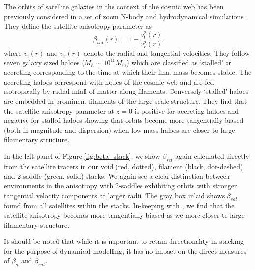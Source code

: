 The orbits of satellite galaxies in the context of the cosmic web has been previously considered in a set of zoom N-body and hydrodynamical simulations \citep{ZOMGiii}. They define the satellite anisotropy parameter as
\begin{equation}
\beta_{sat}(r) = 1 - \frac{v_{t}^2(r)}{v_{r}^{2}(r)} 
\end{equation}
where $v_{t}(r)$ and $v_{r}(r)$ denote the radial and tangential velocities. They follow seven galaxy sized haloes ($M_{h} \sim 10^{11} M_{\odot}$) which are classified as `stalled' or accreting corresponding to the time at which their final mass becomes stable. The accreting haloes correspond with  nodes of the cosmic web and are fed isotropically by radial infall of matter along filaments. Conversely `stalled' haloes are embedded in prominent filaments of the large-scale structure. They find that the satellite anisotropy parameter at $z = 0$ is positive for accreting haloes and negative for stalled haloes showing that orbits become more tangentially biased (both in magnitude and dispersion) when low mass haloes are closer to large filamentary structure. 

In the left panel of Figure \ref{fig:beta_stack}, we show $\beta_{sat}$ again calculated directly from the satellite tracers in our void (red, dotted), filament (black, dot-dashed) and 2-saddle (green, solid) stacks. We again see a clear distinction between environments in the anisotropy with 2-saddles exhibiting orbits with stronger tangential velocity components at larger radii. The gray box inlaid shows $\overline{\beta_{sat}}$ found from all satellites within the stacks. In-keeping with \citet{ZOMGiii}, we find that the satellite anisotropy becomes more tangentially biased as we more closer to large filamentary structure.

It should be noted that while it is important to retain directionality in stacking for the purpose of dynamical modelling, it has no impact on the direct measures of $\beta_{\sigma}$ and $\beta_{sat}$.